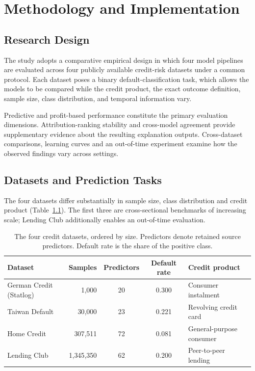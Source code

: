 \chapter{Methodology and Implementation}\label{ch:method}

\section{Research Design}\label{sec:design}

The study adopts a comparative empirical design in which four model pipelines are
evaluated across four publicly available credit-risk datasets under a common protocol.
Each dataset poses a binary default-classification task, which allows the models to be
compared while the credit product, the exact outcome definition, sample size, class
distribution, and temporal information vary.

Predictive and profit-based performance constitute the primary evaluation dimensions.
Attribution-ranking stability and cross-model agreement provide supplementary evidence
about the resulting explanation outputs. Cross-dataset comparisons, learning curves and
an out-of-time experiment examine how the observed findings vary across settings.

\section{Datasets and Prediction Tasks}\label{sec:datasets}

The four datasets differ substantially in sample size, class distribution and credit
product (Table~\ref{tab:datasets}). The first three are cross-sectional benchmarks of
increasing scale; Lending Club additionally enables an out-of-time evaluation.

\begin{table}[htbp]
\centering
\small
\begin{tabular}{lrccl}
\toprule
\textbf{Dataset} & \textbf{Samples} & \textbf{Predictors}
& \textbf{Default rate} & \textbf{Credit product} \\
\midrule
German Credit (Statlog) & 1{,}000       & 20 & 0.300 & Consumer instalment \\
Taiwan Default          & 30{,}000      & 23 & 0.221 & Revolving credit card \\
Home Credit             & 307{,}511     & 72 & 0.081 & General-purpose consumer \\
Lending Club            & 1{,}345{,}350 & 62 & 0.200 & Peer-to-peer lending \\
\bottomrule
\end{tabular}
\caption[The four credit datasets]{The four credit datasets, ordered by size.
Predictors denote retained source predictors. Default rate is the share of the positive
class.}
\label{tab:datasets}
\end{table}


